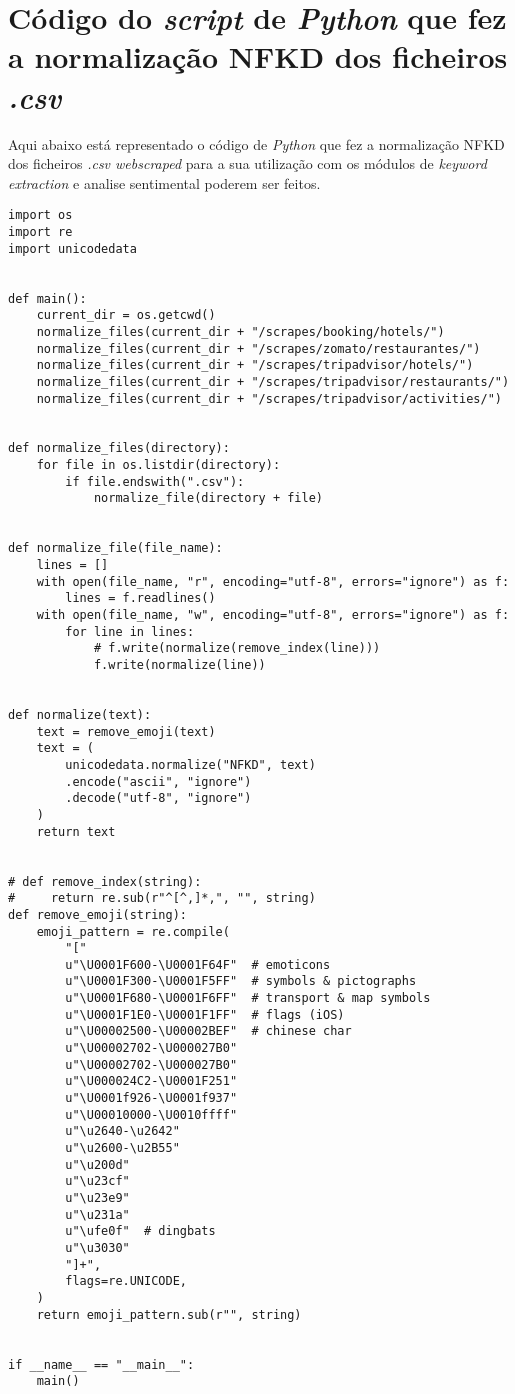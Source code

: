\chapter{Código do \textit{script} de \textit{Python} que fez a normalização NFKD dos ficheiros \textit{.csv}}
\label{ap8}

Aqui abaixo está representado o código de \textit{Python} que fez a normalização NFKD dos ficheiros \textit{.csv webscraped} para a sua utilização com os módulos de \textit{keyword extraction} e analise sentimental poderem ser feitos.

\begin{verbatim}
import os
import re
import unicodedata


def main():
    current_dir = os.getcwd()
    normalize_files(current_dir + "/scrapes/booking/hotels/")
    normalize_files(current_dir + "/scrapes/zomato/restaurantes/")
    normalize_files(current_dir + "/scrapes/tripadvisor/hotels/")
    normalize_files(current_dir + "/scrapes/tripadvisor/restaurants/")
    normalize_files(current_dir + "/scrapes/tripadvisor/activities/")


def normalize_files(directory):
    for file in os.listdir(directory):
        if file.endswith(".csv"):
            normalize_file(directory + file)


def normalize_file(file_name):
    lines = []
    with open(file_name, "r", encoding="utf-8", errors="ignore") as f:
        lines = f.readlines()
    with open(file_name, "w", encoding="utf-8", errors="ignore") as f:
        for line in lines:
            # f.write(normalize(remove_index(line)))
            f.write(normalize(line))


def normalize(text):
    text = remove_emoji(text)
    text = (
        unicodedata.normalize("NFKD", text)
        .encode("ascii", "ignore")
        .decode("utf-8", "ignore")
    )
    return text


# def remove_index(string):
#     return re.sub(r"^[^,]*,", "", string)
def remove_emoji(string):
    emoji_pattern = re.compile(
        "["
        u"\U0001F600-\U0001F64F"  # emoticons
        u"\U0001F300-\U0001F5FF"  # symbols & pictographs
        u"\U0001F680-\U0001F6FF"  # transport & map symbols
        u"\U0001F1E0-\U0001F1FF"  # flags (iOS)
        u"\U00002500-\U00002BEF"  # chinese char
        u"\U00002702-\U000027B0"
        u"\U00002702-\U000027B0"
        u"\U000024C2-\U0001F251"
        u"\U0001f926-\U0001f937"
        u"\U00010000-\U0010ffff"
        u"\u2640-\u2642"
        u"\u2600-\u2B55"
        u"\u200d"
        u"\u23cf"
        u"\u23e9"
        u"\u231a"
        u"\ufe0f"  # dingbats
        u"\u3030"
        "]+",
        flags=re.UNICODE,
    )
    return emoji_pattern.sub(r"", string)


if __name__ == "__main__":
    main()

\end{verbatim}